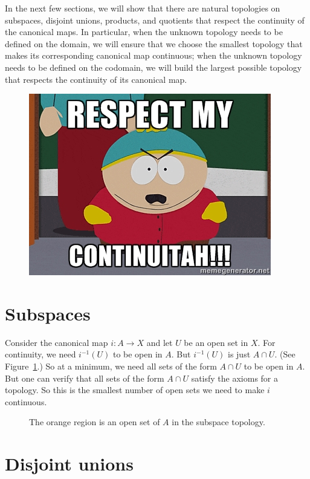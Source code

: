 \documentclass[12pt]{article}
\begin{document}
In the next few sections, we will show that there are natural topologies on subspaces, disjoint unions, products, and quotients that respect the continuity of the canonical maps. In particular, when the unknown topology needs to be defined on the domain, we will ensure that we choose the smallest topology that makes its corresponding canonical map continuous; when the unknown topology needs to be defined on the codomain, we will build the largest possible topology that respects the continuity of its canonical map.

\begin{figure}[H]
\centering
\includegraphics{respect_my_continuitah.jpg}
\end{figure}
\section{Subspaces}

Consider the canonical map $i:A \to X$ and let $U$ be an open set in $X$. For continuity, we need $i^{-1}(U)$ to be open in $A$. But $i^{-1}(U)$ is just $A \cap U$. (See Figure~\ref{F:subset_topology}.) So at a minimum, we need all sets of the form $A \cap U$ to be open in $A$. But one can verify that all sets of the form $A \cap U$ satisfy the axioms for a topology. So this is the smallest number of open sets we need to make $i$ continuous.

\begin{figure}[ht]
\centering

\caption{The orange region is an open set of $A$ in the subspace topology.}
\label{F:subset_topology}
\end{figure}

\section{Disjoint unions}
\end{document}
